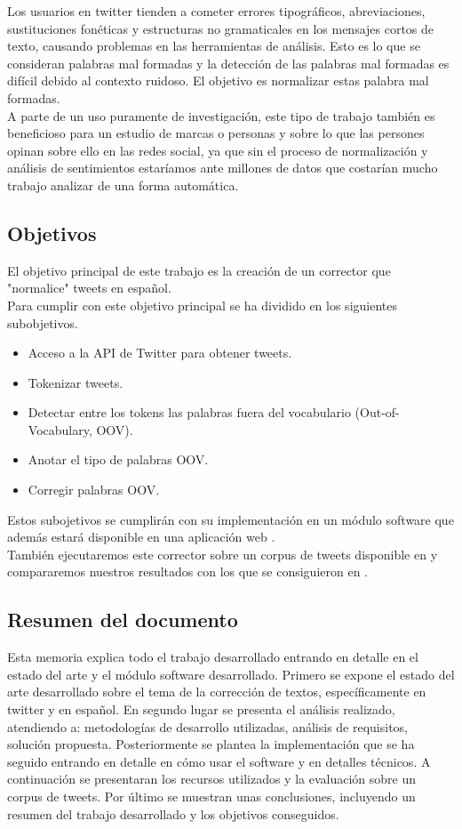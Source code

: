 \documentclass[spanish,12pt, a4paper,twoside]{paper}
\begin{document}
Los usuarios en twitter tienden a cometer errores tipográficos, abreviaciones, sustituciones fonéticas y estructuras no gramaticales en los mensajes cortos de texto, causando problemas en las herramientas de análisis. Esto es lo que se consideran palabras mal formadas y la detección de las palabras mal formadas es difícil debido al contexto ruidoso. El objetivo es normalizar estas palabra mal formadas.\\

A parte de un uso puramente de investigación, este tipo de trabajo también es beneficioso para un estudio de marcas o personas y sobre lo que las persones opinan sobre ello en las redes social, ya que sin el proceso de normalización y análisis de sentimientos estaríamos ante millones de datos que costarían mucho trabajo analizar de una forma automática.

\subsection{Objetivos}\label{sec:objetivos}
El objetivo principal de este trabajo es la creación de un corrector que "normalice" tweets en español.\\Para cumplir con este objetivo principal se ha dividido en los siguientes subobjetivos.
\begin{itemize}
\item Acceso a la API de Twitter para obtener tweets.
\item Tokenizar tweets.
\item Detectar entre los tokens las palabras fuera del vocabulario (Out-of-Vocabulary, OOV).
\item Anotar el tipo de palabras OOV.
\item Corregir palabras OOV. 
\end{itemize}
Estos subojetivos se cumplirán con su implementación en un módulo software que además estará disponible en una aplicación web \cite{tweetscweb}.\\

También ejecutaremos este corrector sobre un corpus de tweets disponible en \cite{tweetnorm} y compararemos nuestros resultados con los que se consiguieron en \cite{alegria:2013}.

\subsection{Resumen del documento}\label{sec:resumen}
Esta memoria explica todo el trabajo desarrollado entrando en detalle en el estado del arte y el  módulo software desarrollado. Primero se expone el estado del arte desarrollado sobre el tema de la corrección de textos, específicamente en twitter y en español. En segundo lugar se presenta el análisis realizado, atendiendo a: metodologías de desarrollo utilizadas, análisis de requisitos, solución propuesta. Posteriormente se plantea la implementación que se ha seguido entrando en detalle en cómo usar el software y en detalles técnicos. A continuación se presentaran los recursos utilizados y la evaluación sobre un corpus de tweets. Por último se muestran unas conclusiones, incluyendo un resumen del trabajo desarrollado y los objetivos conseguidos.
\end{document}
